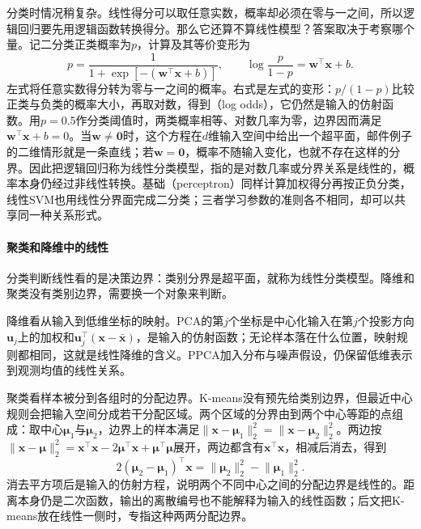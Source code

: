 分类时情况稍复杂。线性得分可以取任意实数，概率却必须在零与一之间，所以逻辑回归要先用逻辑函数转换得分。那么它还算不算线性模型？答案取决于考察哪个量。记二分类正类概率为$p$，计算及其等价变形为
\begin{equation}
  p=\frac{1}{1+\exp[-(\bm{w}^{\top}\bm{x}+b)]},
  \qquad
  \log\frac{p}{1-p}=\bm{w}^{\top}\bm{x}+b.
  \label{eq:models-logistic-structure}
\end{equation}
左式将任意实数得分转为零与一之间的概率。右式是左式的变形：$p/(1-p)$比较正类与负类的概率大小，再取对数，得到（log odds），它仍然是输入的仿射函数。用$p=0.5$作分类阈值时，两类概率相等、对数几率为零，边界因而满足$\bm{w}^{\top}\bm{x}+b=0$。当$\bm{w}\ne\bm{0}$时，这个方程在$d$维输入空间中给出一个超平面，邮件例子的二维情形就是一条直线；若$\bm{w}=\bm{0}$，概率不随输入变化，也就不存在这样的分界。因此把逻辑回归称为线性分类模型，指的是对数几率或分界关系是线性的，概率本身仍经过非线性转换。基础（perceptron）同样计算加权得分再按正负分类，线性SVM也用线性分界面完成二分类；三者学习参数的准则各不相同，却可以共享同一种关系形式。

\paragraph{聚类和降维中的线性}

分类判断线性看的是决策边界：类别分界是超平面，就称为线性分类模型。降维和聚类没有类别边界，需要换一个对象来判断。

降维看从输入到低维坐标的映射。PCA的第$j$个坐标是中心化输入在第$j$个投影方向$\bm{u}_j$上的加权和$\bm{u}_j^{\top}(\bm{x}-\bar{\bm{x}})$，是输入的仿射函数；无论样本落在什么位置，映射规则都相同，这就是线性降维的含义。PPCA加入分布与噪声假设，仍保留低维表示到观测均值的线性关系。

聚类看样本被分到各组时的分配边界。K-means没有预先给类别边界，但最近中心规则会把输入空间分成若干分配区域。两个区域的分界由到两个中心等距的点组成：取中心$\bm{\mu}_1$与$\bm{\mu}_2$，边界上的样本满足$\lVert\bm{x}-\bm{\mu}_1\rVert_2^2=\lVert\bm{x}-\bm{\mu}_2\rVert_2^2$。两边按$\lVert\bm{x}-\bm{\mu}\rVert_2^2=\bm{x}^{\top}\bm{x}-2\bm{\mu}^{\top}\bm{x}+\bm{\mu}^{\top}\bm{\mu}$展开，两边都含有$\bm{x}^{\top}\bm{x}$，相减后消去，得到
\begin{equation}
  2(\bm{\mu}_2-\bm{\mu}_1)^{\top}\bm{x}
  =\lVert\bm{\mu}_2\rVert_2^2-\lVert\bm{\mu}_1\rVert_2^2.
  \label{eq:models-kmeans-boundary}
\end{equation}
消去平方项后是输入的仿射方程，说明两个不同中心之间的分配边界是线性的。距离本身仍是二次函数，输出的离散编号也不能解释为输入的线性函数；后文把K-means放在线性一侧时，专指这种两两分配边界。

